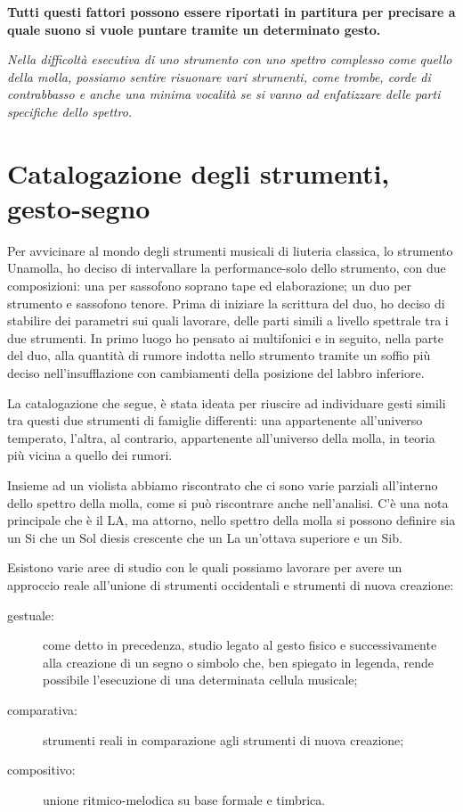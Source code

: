 \textbf{Tutti questi fattori possono essere riportati in partitura per precisare
a quale suono si vuole puntare tramite un determinato gesto.}

\textit{Nella difficoltà esecutiva di uno strumento con uno spettro complesso
come quello della molla, possiamo sentire risuonare vari strumenti, come trombe,
corde di contrabbasso e anche una minima vocalità se si vanno ad enfatizzare
delle parti specifiche dello spettro.}




\section{Catalogazione degli strumenti, gesto-segno}

Per avvicinare al mondo degli strumenti musicali di liuteria classica, lo strumento
Unamolla, ho deciso di intervallare la performance-solo dello strumento, con due
composizioni: una per sassofono soprano tape ed elaborazione; un duo per
strumento e sassofono tenore. Prima di iniziare la scrittura del duo, ho deciso
di stabilire dei parametri sui quali lavorare, delle parti simili a livello
spettrale tra i due strumenti. In primo luogo ho pensato ai multifonici e in
seguito, nella parte del duo, alla quantità di rumore indotta nello strumento
tramite un soffio più deciso nell'insufflazione  con cambiamenti della posizione
del labbro inferiore.

La catalogazione che segue, è stata ideata per riuscire ad individuare gesti
simili tra questi due strumenti di famiglie differenti: una appartenente all’universo
temperato, l’altra, al contrario, appartenente all’universo della molla, in teoria
più vicina a quello dei rumori.

Insieme ad un violista abbiamo riscontrato che ci sono varie parziali all’interno
dello spettro della molla, come si può riscontrare anche nell’analisi. C’è una
nota principale che è il LA, ma attorno, nello spettro della molla si possono
definire sia un Si che un Sol diesis crescente che un La un’ottava superiore e
un Sib.

Esistono varie aree di studio con le quali possiamo lavorare per avere un approccio
reale all’unione di strumenti occidentali e strumenti di nuova creazione:

\begin{description}
  \item[gestuale:] come detto in precedenza, studio legato al gesto fisico e
	successivamente alla creazione di un segno o simbolo che, ben spiegato in
	legenda, rende possibile l’esecuzione di una determinata cellula musicale;
  \item[comparativa:] strumenti reali in comparazione agli strumenti di nuova
	creazione;
  \item[compositivo:] unione ritmico-melodica su base formale e timbrica.
\end{description}

